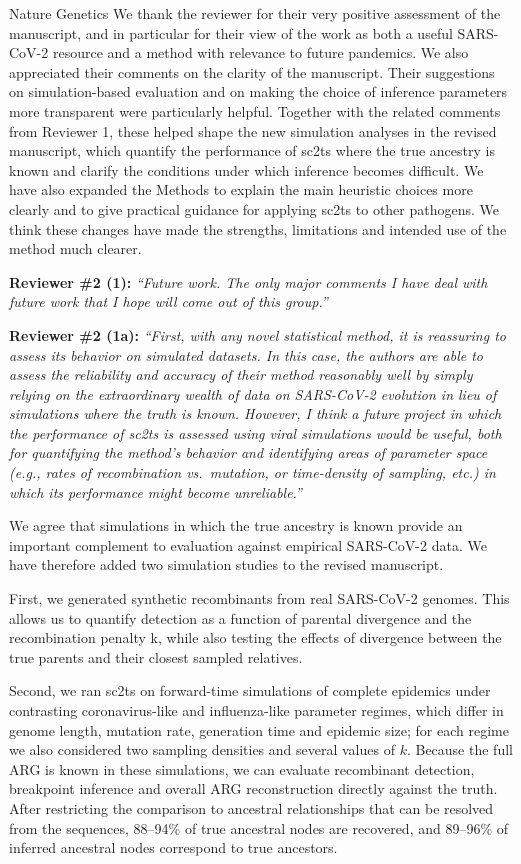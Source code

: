 \documentclass{letter}
\begin{document}
\begin{letter}{Nature Genetics}
We thank the reviewer for their very positive assessment of the manuscript, and
in particular for their view of the work as both a useful SARS-CoV-2 resource
and a method with relevance to future pandemics. We also appreciated their
comments on the clarity of the manuscript. Their suggestions on
simulation-based evaluation and on making the choice of inference parameters
more transparent were particularly helpful. Together with the related comments
from Reviewer 1, these helped shape the new simulation analyses in the revised
manuscript, which quantify the performance of sc2ts where the true ancestry is
known and clarify the conditions under which inference becomes difficult. We
have also expanded the Methods to explain the main heuristic choices more
clearly and to give practical guidance for applying sc2ts to other pathogens.
We think these changes have made the strengths, limitations and intended use of
the method much clearer.

\noindent \textbf{Reviewer \#2 (1):} \textit{``Future work. The only major comments I
have deal with future work that I hope will come out of this group.''}

\noindent \textbf{Reviewer \#2 (1a):} \textit{``First, with any novel statistical
method, it is reassuring to assess its behavior on simulated datasets. In this
case, the authors are able to assess the reliability and accuracy of their
method reasonably well by simply relying on the extraordinary wealth of data
on SARS-CoV-2 evolution in lieu of simulations where the truth is known.
However, I think a future project in which the performance of sc2ts is
assessed using viral simulations would be useful, both for quantifying the
method's behavior and identifying areas of parameter space (e.g., rates of
recombination vs.\ mutation, or time-density of sampling, etc.) in which its
performance might become unreliable.''}

We agree that simulations in which the true ancestry is known provide an
important complement to evaluation against empirical SARS-CoV-2 data. We have
therefore added two simulation studies to the revised manuscript.

First, we generated synthetic recombinants from real SARS-CoV-2 genomes. This
allows us to quantify detection as a function of parental divergence and the
recombination penalty k, while also testing the effects of divergence between
the true parents and their closest sampled relatives.

Second, we ran sc2ts on forward-time simulations of complete epidemics under
contrasting coronavirus-like and influenza-like parameter regimes, which differ
in genome length, mutation rate, generation time and epidemic size; for each
regime we also considered two sampling densities and several values of $k$.
Because the full ARG is known in these simulations, we can evaluate recombinant
detection, breakpoint inference and overall ARG reconstruction directly against
the truth. After restricting the comparison to ancestral relationships that can
be resolved from the sequences, 88--94\% of true ancestral nodes are recovered,
and 89--96\% of inferred ancestral nodes correspond to true ancestors.


\end{letter}
\end{document}
